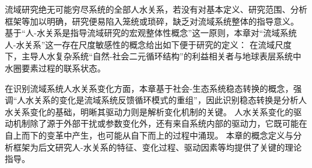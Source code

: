 流域研究绝无可能穷尽系统的全部人水关系，若没有对基本定义、研究范围、分析框架等加以明确，研究便易陷入笼统或琐碎，缺乏对流域系统整体的指导意义。
基于“人-水关系是指导流域研究的宏观整体性概念”这一原则，本章对“流域系统人-水关系”这一存在尺度敏感性的概念给出如下便于研究的定义：
在流域尺度下，主导人水复杂系统“自然-社会二元循环结构”的利益相关者与地球表层系统中水圈要素过程的联系状态。

在识别流域系统人水关系变化方面，本章基于社会-生态系统稳态转换的概念，强调“人水关系的变化是流域系统反馈循环模式的重组”，因此识别稳态转换是分析人水关系变化的基础，明晰其驱动力则是解析变化机制的关键。
人水关系变化的驱动机制除了源于外部干扰或参数变化外，还有来自系统内部的驱动力，它既可能在自上而下的变革中产生，也可能从自下而上的过程中涌现。
本章的概念定义与分析框架为后文研究人-水关系的特征、变化过程、驱动因素等均提供了关键的理论指导。
